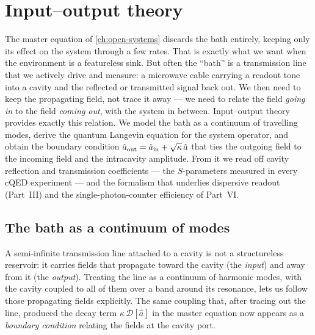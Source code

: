 \chapter{Input--output theory}
\label{ch:input-output}

The master equation of \cref{ch:open-systems} discards the bath
entirely, keeping only its effect on the system through a few rates.
That is exactly what we want when the environment is a featureless
sink. But often the ``bath'' is a transmission line that we
actively drive and measure: a microwave cable carrying a readout
tone into a cavity and the reflected or transmitted signal back out.
We then need to keep the propagating field, not trace it away ---
we need to relate the field \emph{going in} to the field
\emph{coming out}, with the system in between. Input--output theory
provides exactly this relation. We model the bath as a continuum of
travelling modes, derive the quantum Langevin equation for the
system operator, and obtain the boundary condition
$\hat a_{\rm out}=\hat a_{\rm in}+\sqrt{\kappa}\,\hat a$ that ties
the outgoing field to the incoming field and the intracavity
amplitude. From it we read off cavity reflection and transmission
coefficients --- the $S$-parameters measured in every cQED
experiment --- and the formalism that underlies dispersive readout
(Part~III) and the single-photon-counter efficiency of Part~VI.

\section{The bath as a continuum of modes}
\label{sec:continuum-bath}

\begin{phenomenon}
A semi-infinite transmission line attached to a cavity is not a
structureless reservoir: it carries fields that propagate toward
the cavity (the \emph{input}) and away from it (the \emph{output}).
Treating the line as a continuum of harmonic modes, with the cavity
coupled to all of them over a band around its resonance, lets us
follow those propagating fields explicitly. The same coupling that,
after tracing out the line, produced the decay term $\kappa\,
\mathcal D[\hat a]$ in the master equation now appears as a
\emph{boundary condition} relating the fields at the cavity port.
\end{phenomenon}

